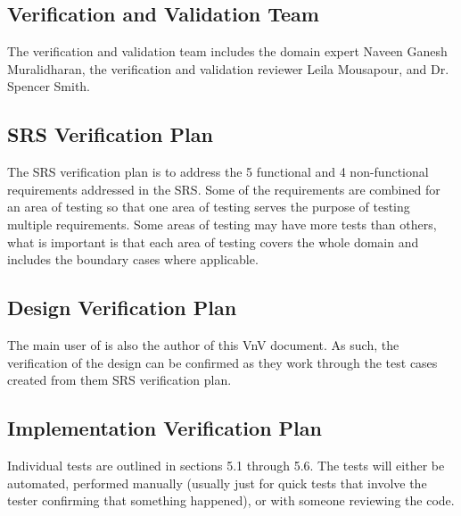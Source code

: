 \documentclass[12pt, titlepage]{article}
\begin{document}
\subsection{Verification and Validation Team}

The verification and validation team includes the domain expert Naveen Ganesh Muralidharan, the verification and validation reviewer Leila Mousapour, and Dr. Spencer Smith.

\subsection{SRS Verification Plan}

The SRS verification plan is to address the 5 functional and 4 non-functional requirements addressed in the SRS. Some of the requirements are combined for an area of testing so that one area of testing serves the purpose of testing multiple requirements. Some areas of testing may have more tests than others, what is important is that each area of testing covers the whole domain and includes the boundary cases where applicable.  



\subsection{Design Verification Plan}

The main user of \progname{} is also the author of this VnV document. As such, the verification of the design can be confirmed as they work through the test cases created from them SRS verification plan.


\subsection{Implementation Verification Plan}

Individual tests are outlined in sections 5.1 through 5.6. The tests will either be automated, performed manually (usually just for quick tests that involve the tester confirming that something happened), or with someone reviewing the code.

\end{document}
